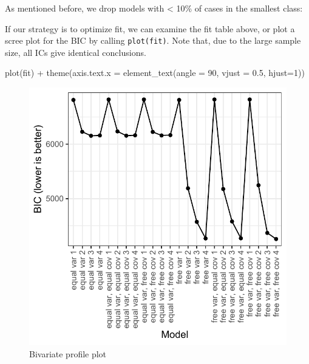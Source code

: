 \documentclass[
  man,floatsintext]{apa6}
\newenvironment{Shaded}{\begin{snugshade}}{\end{snugshade}}
\newcommand{\AttributeTok}[1]{\textcolor[rgb]{0.77,0.63,0.00}{#1}}
\newcommand{\DecValTok}[1]{\textcolor[rgb]{0.00,0.00,0.81}{#1}}
\newcommand{\FloatTok}[1]{\textcolor[rgb]{0.00,0.00,0.81}{#1}}
\newcommand{\FunctionTok}[1]{\textcolor[rgb]{0.00,0.00,0.00}{#1}}
\newcommand{\NormalTok}[1]{#1}
\newcommand{\OtherTok}[1]{\textcolor[rgb]{0.56,0.35,0.01}{#1}}
\newcommand{\SpecialCharTok}[1]{\textcolor[rgb]{0.00,0.00,0.00}{#1}}
\begin{document}
As mentioned before, we drop models with \textless{} 10\% of cases in the smallest class:

\begin{Shaded}
\end{Shaded}

If our strategy is to optimize fit, we can examine the fit table above, or plot a scree plot for the BIC by calling \texttt{plot(fit)}.
Note that, due to the large sample size, all ICs give identical conclusions.

\begin{Shaded}
\begin{Highlighting}[]
\FunctionTok{plot}\NormalTok{(fit) }\SpecialCharTok{+} \FunctionTok{theme}\NormalTok{(}\AttributeTok{axis.text.x =} \FunctionTok{element\_text}\NormalTok{(}\AttributeTok{angle =} \DecValTok{90}\NormalTok{, }\AttributeTok{vjust =} \FloatTok{0.5}\NormalTok{, }\AttributeTok{hjust=}\DecValTok{1}\NormalTok{))}
\end{Highlighting}
\end{Shaded}

\begin{figure}
\includegraphics[width=1\linewidth]{appendices/gmm_plotfit} \caption{Bivariate profile plot}\label{fig:unnamed-chunk-16}
\end{figure}
\end{document}
